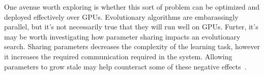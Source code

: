 One avenue worth exploring is whether this sort of problem can be optimized and deployed effectively over GPUs.
Evolutionary algorithms are embarassingly parallel, but it's not necessarily true that they will run well on GPUs.
Furter, it’s may be worth investigating how parameter sharing impacts an evolutionary search.
Sharing parameters decreases the complexity of the learning task, however it increases the required communication required in the system.
Allowing parameters to grow stale may help counteract some of these negative effects~\cite{cui2014exploiting}.
